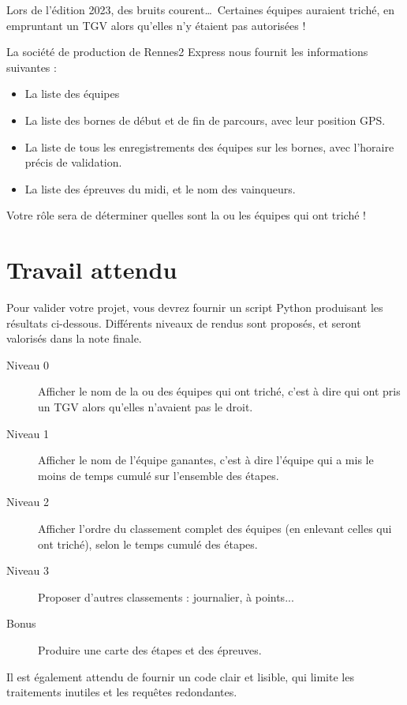 \documentclass[11pt,a4paper]{article}
\begin{document}
\vspace{2em}
Lors de l'édition 2023, des bruits courent\dots ~Certaines équipes auraient triché, en empruntant un TGV alors qu'elles n'y étaient pas autorisées !


La société de production de Rennes2 Express nous fournit les informations suivantes : 
\begin{itemize}
    \item La liste des équipes
    \item La liste des bornes de début et de fin de parcours, avec leur position GPS.
    \item La liste de tous les enregistrements des équipes sur les bornes, avec l'horaire précis de validation.
    \item La liste des épreuves du midi, et le nom des vainqueurs.
\end{itemize}


Votre rôle sera de déterminer quelles sont la ou les équipes qui ont triché !

\section{Travail attendu}

Pour valider votre projet, vous devrez fournir un script Python produisant les résultats ci-dessous. Différents niveaux de rendus sont proposés, et seront valorisés dans la note finale. 

\begin{description}
    \item[Niveau 0] Afficher le nom de la ou des équipes qui ont triché, c'est à dire qui ont pris un TGV alors qu'elles n'avaient pas le droit. 
    \item[Niveau 1] Afficher le nom de l'équipe ganantes, c'est à dire l'équipe qui a mis le moins de temps cumulé sur l'ensemble des étapes. 
    \item[Niveau 2] Afficher l'ordre du classement complet des équipes (en enlevant celles qui ont triché), selon le temps cumulé des étapes.
    \item[Niveau 3] Proposer d'autres classements : journalier, à points...
    \item[Bonus] Produire une carte des étapes et des épreuves.
\end{description}

Il est également attendu de fournir un code clair et lisible, qui limite les traitements inutiles et les requêtes redondantes.
\end{document}
